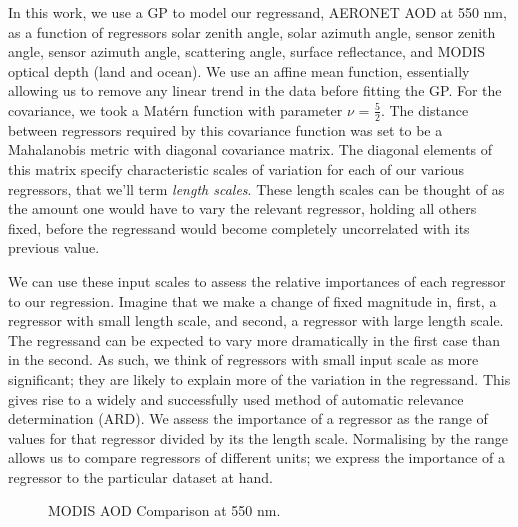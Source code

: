 \documentclass[journal]{IEEEtran}
\begin{document}
In this work, we use a GP to model our regressand, AERONET AOD at 550 nm, as a function of regressors solar zenith angle, solar azimuth angle,  sensor zenith angle, sensor azimuth angle,  scattering angle, surface reflectance, and MODIS optical depth (land and ocean). We use an affine mean function, essentially allowing us to remove any linear trend in the data before fitting the GP. For the covariance, we took a Mat\'{e}rn function with parameter $\nu$ = $\frac{5}{2}$. The distance between regressors required by this covariance function was set to be a Mahalanobis metric with diagonal covariance matrix. The diagonal elements of this matrix specify characteristic scales of variation for each of our various regressors, that we'll term \emph{length scales}. These length scales can be thought of as the amount one would have to vary the relevant regressor, holding all others fixed, before the regressand would become completely uncorrelated with its previous value.  

We can use these input scales to assess the relative importances of each regressor to our regression. Imagine that we make a change of fixed magnitude in, first, a regressor with small length scale, and second, a regressor with large length scale. The regressand can be expected to vary more dramatically in the first case than in the second. As such, we think of regressors with small input scale as more significant; they are likely to explain more of the variation in the regressand. This gives rise to a widely and successfully used \cite{GPsBook} method of automatic relevance determination (ARD). We assess the importance of a regressor as the range of values for that regressor divided by its the length scale. Normalising by the range allows us to compare regressors of different units; we express the importance of a regressor to the particular dataset at hand. 

\begin{figure*}
  \centering
  \small
{}
\hspace{-1cm}
  \caption{MODIS AOD Comparison at 550 nm.}
  \label{justfb}
\end{figure*}
\end{document}
